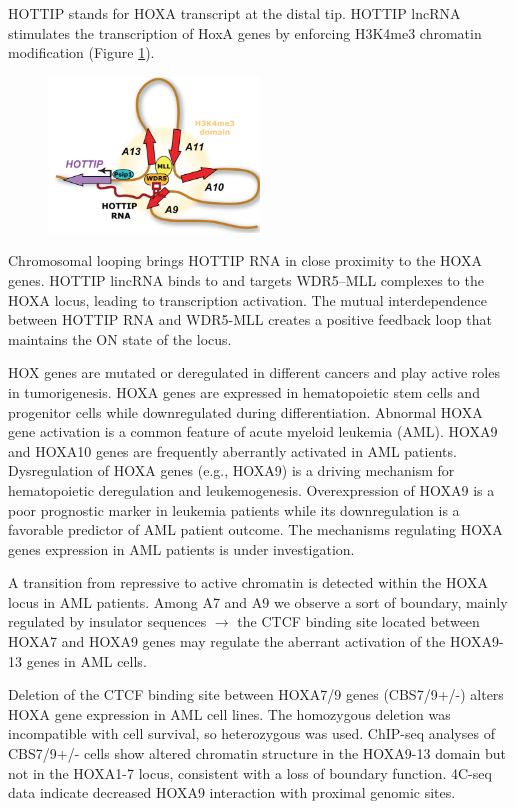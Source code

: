 HOTTIP stands for HOXA transcript at the distal tip. HOTTIP lncRNA stimulates the transcription of HoxA genes by enforcing H3K4me3 chromatin modification (Figure \ref{fig:hottip}).

\begin{figure}
\centering
\includegraphics[width=0.5\textwidth]{../_resources/Screen_Shot_2022-11-25_at_11-49-03.png}
\caption{}
\label{fig:hottip}
\end{figure}

Chromosomal looping brings HOTTIP RNA in close proximity to the HOXA genes. HOTTIP lincRNA binds to and targets WDR5--MLL complexes to the HOXA locus, leading to transcription activation. The mutual interdependence between HOTTIP RNA and WDR5-MLL creates a positive feedback loop that maintains the ON state of the locus.

HOX genes are mutated or deregulated in different cancers and play active roles in tumorigenesis. HOXA genes are expressed in hematopoietic stem cells and progenitor cells while downregulated during differentiation. Abnormal HOXA gene activation is a common feature of acute myeloid leukemia (AML). HOXA9 and HOXA10 genes are frequently aberrantly activated in AML patients. Dysregulation of HOXA genes (e.g., HOXA9) is a driving mechanism for hematopoietic deregulation and leukemogenesis. Overexpression of HOXA9 is a poor prognostic marker in leukemia patients while its downregulation is a favorable predictor of AML patient outcome. The mechanisms regulating HOXA genes expression in AML patients is under investigation.

A transition from repressive to active chromatin is detected within the HOXA locus in AML patients. Among A7 and A9 we observe a sort of boundary, mainly regulated by insulator sequences $\rightarrow$ the CTCF binding site located between HOXA7 and HOXA9 genes may regulate the aberrant activation of the HOXA9-13 genes in AML cells.

Deletion of the CTCF binding site between HOXA7/9 genes (CBS7/9+/-) alters HOXA gene expression in AML cell lines. The homozygous deletion was incompatible with cell survival, so heterozygous was used. ChIP-seq analyses of CBS7/9+/- cells show altered chromatin structure in the HOXA9-13 domain but not in the HOXA1-7 locus, consistent with a loss of boundary function. 4C-seq data indicate decreased HOXA9 interaction with proximal genomic sites.

